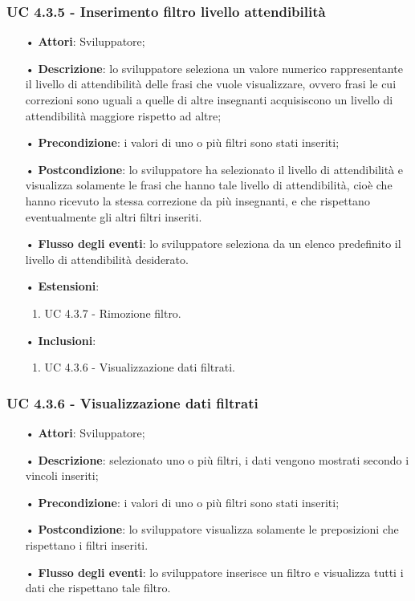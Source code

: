 \subsubsection{UC 4.3.5 - Inserimento filtro livello attendibilità}
\begin{itemize}
	\item[•]\textbf{Attori}: Sviluppatore;
	\item[•]\textbf{Descrizione}: lo sviluppatore seleziona un valore numerico rappresentante il livello di attendibilità delle frasi che vuole visualizzare, ovvero frasi le cui correzioni sono uguali a quelle di altre insegnanti acquisiscono un livello di attendibilità maggiore rispetto ad altre;
	\item[•]\textbf{Precondizione}: i valori di uno o più filtri sono stati inseriti;
	\item[•]\textbf{Postcondizione}: lo sviluppatore ha selezionato il livello di attendibilità e visualizza solamente le frasi che hanno tale livello di attendibilità, cioè che hanno ricevuto la stessa correzione da più insegnanti, e che rispettano eventualmente gli altri filtri inseriti.
	\item[•]\textbf{Flusso degli eventi}: lo sviluppatore seleziona da un elenco predefinito il livello di attendibilità desiderato.
\item[•]\textbf{Estensioni}: 
	\begin{enumerate}
		\item UC 4.3.7 - Rimozione filtro.
	\end{enumerate}
	\item[•]\textbf{Inclusioni}:
	\begin{enumerate}
		\item UC 4.3.6 - Visualizzazione dati filtrati.
	\end{enumerate}
\end{itemize}



\subsubsection{UC 4.3.6 - Visualizzazione dati filtrati}
\begin{itemize}
	\item[•]\textbf{Attori}: Sviluppatore;
	\item[•]\textbf{Descrizione}: selezionato uno o più filtri, i dati vengono mostrati secondo i vincoli inseriti;
	\item[•]\textbf{Precondizione}: i valori di uno o più filtri sono stati inseriti;
	\item[•]\textbf{Postcondizione}: lo sviluppatore visualizza solamente le preposizioni che rispettano i filtri inseriti.
	\item[•]\textbf{Flusso degli eventi}: lo sviluppatore inserisce un filtro e visualizza tutti i dati che rispettano tale filtro.
\end{itemize}

